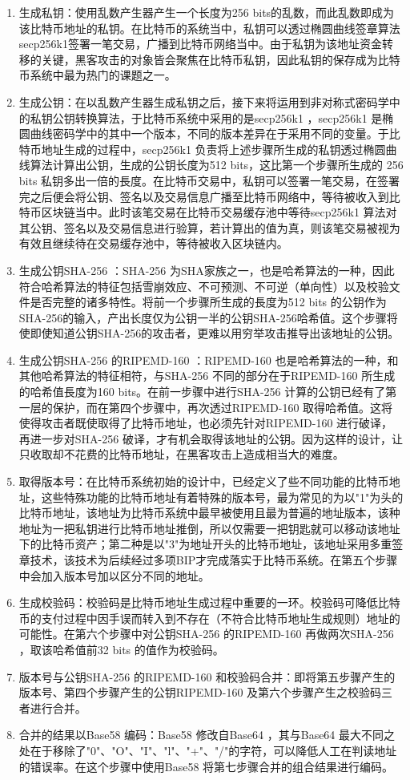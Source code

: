 			\begin{enumerate}
				\item 生成私钥：使用乱数产生器产生一个长度为256 bits的乱数，而此乱数即成为该比特币地址的私钥。在比特币的系统当中，私钥可以透过椭圆曲线签章算法secp256k1签署一笔交易，广播到⽐特币网络当中。由于私钥为该地址资金转移的关键，黑客攻击的对象皆会聚焦在比特币私钥，因此私钥的保存成为比特币系统中最为热门的课题之一。
				\item 生成公钥：在以乱数产生器生成私钥之后，接下来将运用到非对称式密码学中的私钥公钥转换算法，于比特币系统中采用的是secp256k1
				，secp256k1 是椭圆曲线密码学中的其中一个版本，不同的版本差异在于采用不同的变量。于比特币地址生成的过程中，secp256k1 负责将上述步骤所生成的私钥透过椭圆曲线算法计算出公钥，生成的公钥长度为512 bits，这比第一个步骤所生成的 256 bits 私钥多出⼀倍的⾧度。在比特币交易中，私钥可以签署一笔交易，在签署完之后便会将公钥、签名以及交易信息广播至比特币网络中，等待被收入到比特币区块链当中。此时该笔交易在⽐特币交易缓存池中等待secp256k1 算法对其公钥、签名以及交易信息进⾏验算，若计算出的值为真，则该笔交易被视为有效且继续待在交易缓存池中，等待被收⼊区块链内。
				\item 生成公钥SHA-256 ：SHA-256 为SHA家族之一，也是哈希算法的一种，因此符合哈希算法的特征包括雪崩效应、不可预测、不可逆（单向性）以及校验文件是否完整的诸多特性。将前一个步骤所⽣成的⾧度为512 bits 的公钥作为SHA-256的输入，产出长度仅为公钥一半的公钥SHA-256哈希值。这个步骤将使即使知道公钥SHA-256的攻击者，更难以⽤穷举攻击推导出该地址的公钥。
				\item 生成公钥SHA-256 的RIPEMD-160 ：RIPEMD-160 也是哈希算法的⼀种，和其他哈希算法的特征相符，与SHA-256 不同的部分在于RIPEMD-160 所⽣成的哈希值⾧度为160 bits。在前一步骤中进⾏SHA-256 计算的公钥已经有了第⼀层的保护，⽽在第四个步骤中，再次透过RIPEMD-160 取得哈希值。这将使得攻击者既使取得了⽐特币地址，也必须先针对RIPEMD-160 进⾏破译，再进⼀步对SHA-256 破译，才有机会取得该地址的公钥。因为这样的设计，让只收取却不花费的⽐特币地址，在⿊客攻击上造成相当⼤的难度。
				\item 取得版本号：在比特币系统初始的设计中，已经定义了些不同功能的比特币地址，这些特殊功能的比特币地址有着特殊的版本号，最为常见的为以"1"为头的比特币地址，该地址为比特币系统中最早被使用且最为普遍的地址版本，该种地址为一把私钥进行比特币地址推倒，所以仅需要一把钥匙就可以移动该地址下的比特币资产；第二种是以"3"为地址开头的比特币地址，该地址采用多重签章技术，该技术为后续经过多项BIP才完成落实于比特币系统。在第五个步骤中会加入版本号加以区分不同的地址。
				\item 生成校验码：校验码是⽐特币地址⽣成过程中重要的⼀环。校验码可降低⽐特币的⽀付过程中因⼿误而转⼊到不存在（不符合⽐特币地址⽣成规则）地址的可能性。在第六个步骤中对公钥SHA-256 的RIPEMD-160 再做两次SHA-256 ，取该哈希值前32 bits 的值作为校验码。
				\item 版本号与公钥SHA-256 的RIPEMD-160 和校验码合并：即将第五步骤产⽣的版本号、第四个步骤产⽣的公钥RIPEMD-160 及第六个步骤产⽣之校验码三者进行合并。
				\item 合并的结果以Base58 编码：Base58 修改⾃Base64 ，其与Base64 最⼤不同之处在于移除了"0"、"O"、"I"、"l"、"+"、"/"的字符，可以降低⼈⼯在判读地址的错误率。在这个步骤中使⽤Base58 将第七步骤合并的组合结果进⾏编码。
			\end{enumerate}

